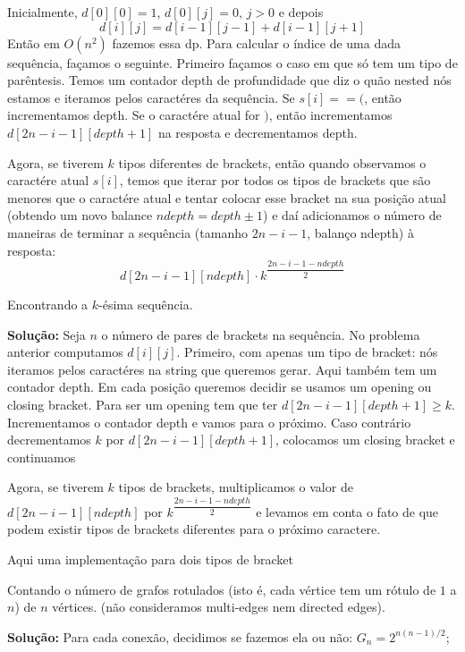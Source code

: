 Inicialmente, $d[0][0]=1$, $d[0][j] = 0, \, j > 0$ e depois
$$ d[i][j] = d[i-1][j-1] + d[i-1][j+1]$$
Então em $O(n^2)$ fazemos essa dp. Para calcular o índice de uma dada sequência, façamos o seguinte. Primeiro façamos o caso em que só tem um tipo de parêntesis. Temos um contador depth de profundidade que diz o quão nested nós estamos e iteramos pelos caractéres da sequência. Se $s[i] == ($, então incrementamos depth. Se o caractére atual for $)$, então incrementamos $d[2n-i-1][depth+1]$ na resposta e decrementamos depth.

Agora, se tiverem $k$ tipos diferentes de brackets, então quando observamos o caractére atual $s[i]$, temos que iterar por todos os tipos de brackets que são menores que o caractére atual e tentar colocar esse bracket na sua posição atual (obtendo um novo balance $ndepth = depth \pm 1$) e daí adicionamos o número de maneiras de terminar a sequência (tamanho $2n-i-1$, balanço ndepth) à resposta:
$$d[2n-i-1][ndepth] \cdot k^{\dfrac{2n-i-1-ndepth}{2}}$$

 Encontrando a $k$-ésima sequência. 

\textbf{Solução:} Seja $n$ o número de pares de brackets na sequência. No problema anterior computamos $d[i][j]$. Primeiro, com apenas um tipo de bracket: nós iteramos pelos caractéres na string que queremos gerar. Aqui também tem um contador depth. Em cada posição queremos decidir se usamos um opening ou closing bracket. Para ser um opening tem que ter $d[2n-i-1][depth+1] \geq k$. Incrementamos o contador depth e vamos para o próximo. Caso contrário decrementamos $k$ por $d[2n-i-1][depth+1]$, colocamos um closing bracket e continuamos


Agora, se tiverem $k$ tipos de brackets, multiplicamos o valor de $d[2n-i-1][ndepth]$ por $k^{\dfrac{2n-i-1-ndepth}{2}}$ e levamos em conta o fato de que podem existir tipos de brackets diferentes para o próximo caractere.

Aqui uma implementação para dois tipos de bracket


 Contando o número de grafos rotulados (isto é, cada vértice tem um rótulo de $1$ a $n$) de $n$ vértices. (não consideramos multi-edges nem directed edges).

\textbf{Solução:} Para cada conexão, decidimos se fazemos ela ou não: $G_n = 2^{n(n-1)/2}$;

